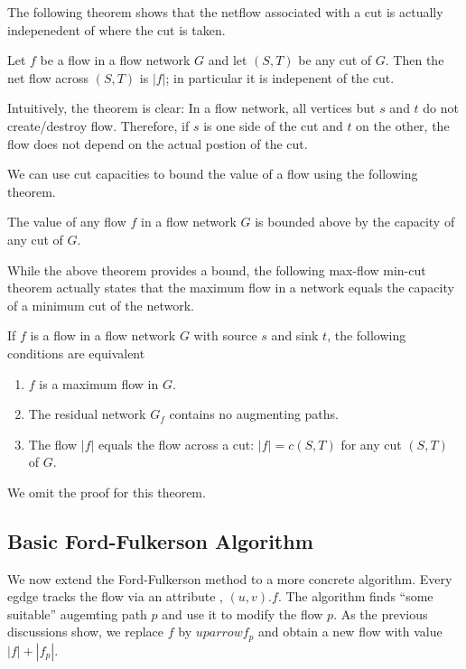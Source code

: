 The following theorem shows that the netflow associated with a cut is actually indepenedent of where the cut is taken.

\begin{theorem}
  Let $f$ be a flow in a flow network $G$ and let $(S,T)$ be any cut of $G$. Then the net flow across $(S,T)$ is $|f|$; in particular it is indepenent of the cut.
\end{theorem}

Intuitively, the theorem is clear: In a flow network, all vertices but $s$ and $t$ do not create/destroy flow. Therefore, if $s$ is one side of the cut and $t$ on the other, the flow does not depend on the actual postion of the cut. 

We can use cut capacities to bound the value of a flow using the following theorem.

\begin{theorem}
  The value of any flow $f$ in a flow network $G$ is bounded above by the capacity of any cut of $G$.
\end{theorem}

While the above theorem provides a bound, the following max-flow min-cut theorem actually states that the maximum flow in a network equals the capacity of a minimum cut of the network.

\begin{theorem}
  If $f$ is a flow in a flow network $G$ with source $s$ and sink $t$, the following conditions are equivalent
  \begin{enumerate}
  \item $f$ is a maximum flow in $G$.
  \item The residual network $G_f$ contains no augmenting paths.
  \item The flow $|f|$ equals the flow across a cut: $|f| = c(S,T)$ for any cut $(S,T)$ of $G$.
  \end{enumerate}
\end{theorem}

We omit the proof for this theorem.

\subsection{Basic Ford-Fulkerson Algorithm}

We now extend the Ford-Fulkerson method to a more concrete algorithm. Every egdge tracks the flow via an attribute , $(u,v).f$. The algorithm finds ``some suitable'' augemting path $p$ and use it to modify the flow $p$. As the previous discussions show, we replace $f$ by $uparrow f_p$ and obtain a new flow with value $|f| + |f_p|$.  

